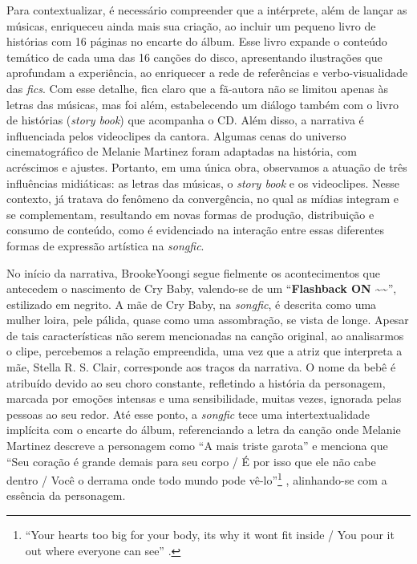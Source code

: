 Para contextualizar, é necessário compreender que a intérprete, além de
lançar as músicas, enriqueceu ainda mais sua criação, ao incluir um
pequeno livro de histórias com 16 páginas no encarte do álbum. Esse
livro expande o conteúdo temático de cada uma das 16 canções do disco,
apresentando ilustrações que aprofundam a experiência, ao enriquecer a
rede de referências e verbo-visualidade das \emph{fics}. Com esse
detalhe, fica claro que a fã-autora não se limitou apenas às letras das
músicas, mas foi além, estabelecendo um diálogo também com o livro de
histórias (\emph{story book}) que acompanha o CD. Além disso, a
narrativa é influenciada pelos videoclipes da cantora. Algumas cenas do
universo cinematográfico de Melanie Martinez foram adaptadas na
história, com acréscimos e ajustes. Portanto, em uma única obra,
observamos a atuação de três influências midiáticas: as letras das
músicas, o \emph{story book} e os videoclipes. Nesse contexto, \textcite{jenkins2009} já tratava do fenômeno da convergência, no qual as mídias
integram e se complementam, resultando em novas formas de produção,
distribuição e consumo de conteúdo, como é evidenciado na interação
entre essas diferentes formas de expressão artística na \emph{songfic}.

No início da narrativa, BrookeYoongi segue fielmente os acontecimentos
que antecedem o nascimento de Cry Baby, valendo-se de um
``\textbf{Flashback ON \textasciitilde\textasciitilde{}}'', estilizado
em negrito. A mãe de Cry Baby, na \emph{songfic}, é descrita como uma
mulher loira, pele pálida, quase como uma assombração, se vista de
longe. Apesar de tais características não serem mencionadas na canção
original, ao analisarmos o clipe, percebemos a relação empreendida, uma
vez que a atriz que interpreta a mãe, Stella R. S. Clair, corresponde
aos traços da narrativa. O nome da bebê é atribuído devido ao seu choro
constante, refletindo a história da personagem, marcada por emoções
intensas e uma sensibilidade, muitas vezes, ignorada pelas pessoas ao
seu redor. Até esse ponto, a \emph{songfic} tece uma intertextualidade
implícita com o encarte do álbum, referenciando a letra da canção onde
Melanie Martinez descreve a personagem como ``A mais triste garota'' \cite{crybaby2015} e menciona que ``Seu coração é grande demais para seu corpo /
É por isso que ele não cabe dentro / Você o derrama onde todo mundo pode
vê-lo''\footnote{``Your heart\textquotesingle s too big for your body,
it\textquotesingle s why it won\textquotesingle t fit inside / You
pour it out where everyone can see'' \cite{crybaby2015}.} \cite{crybaby2015}, alinhando-se com a essência da personagem.

